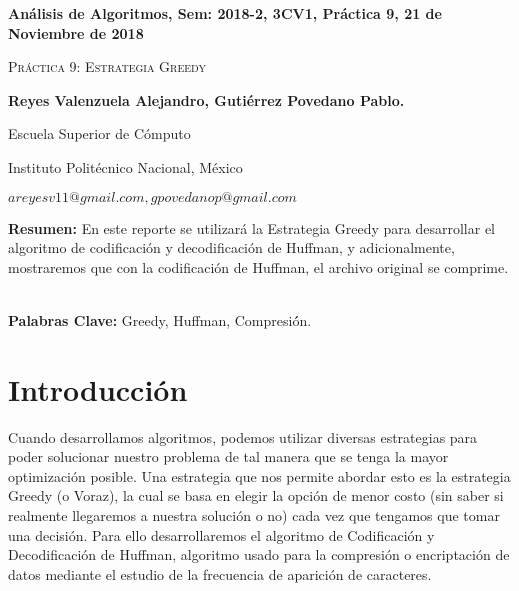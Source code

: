 \documentclass[12pt,twoside]{article}
\date{}
\begin{document}
\centerline{\bf An\'alisis de Algoritmos, Sem: 2018-2, 3CV1, Pr\'actica 9, 21 de Noviembre de 2018}
\centerline{}
\centerline{}
\begin{center}
\Large{\textsc{Pr\'actica 9: Estrategia Greedy}}
\end{center}
\centerline{}
\centerline{\bf {Reyes Valenzuela Alejandro, Guti\'errez Povedano Pablo.}}
\centerline{}
\centerline{Escuela Superior de C\'omputo}
\centerline{Instituto Polit\'ecnico Nacional, M\'exico}
\centerline{$areyesv11@gmail.com, gpovedanop@gmail.com$}
\newtheorem{Theorem}{\quad Theorem}[section]
\newtheorem{Definition}[Theorem]{\quad Definition}
\newtheorem{Corollary}[Theorem]{\quad Corollary}
\newtheorem{Lemma}[Theorem]{\quad Lemma}
\newtheorem{Example}[Theorem]{\quad Example}
\bigskip
\textbf{Resumen:} En este reporte se utilizar\'a la Estrategia Greedy para desarrollar el algoritmo de codificaci\'on y decodificaci\'on de Huffman, y adicionalmente, mostraremos que con la codificaci\'on de Huffman, el archivo original se comprime.\\\\
\centerline{{\bf Palabras Clave:}  Greedy, Huffman, Compresi\'ón.}
\section{Introducci\'on}
Cuando desarrollamos algoritmos, podemos utilizar diversas estrategias para poder solucionar nuestro problema de tal manera que se tenga la mayor optimizaci\'on posible. Una estrategia que nos permite abordar esto es la estrategia Greedy (o Voraz), la cual se basa en elegir la opci\'on de menor costo (sin saber si realmente llegaremos a nuestra soluci\'on o no) cada vez que tengamos que tomar una decisi\'on. Para ello desarrollaremos el algoritmo de Codificaci\'on y Decodificaci\'on de Huffman, algoritmo usado para la compresi\'on o encriptaci\'on de datos mediante el estudio de la frecuencia de aparici\'on de caracteres.
\end{document}
